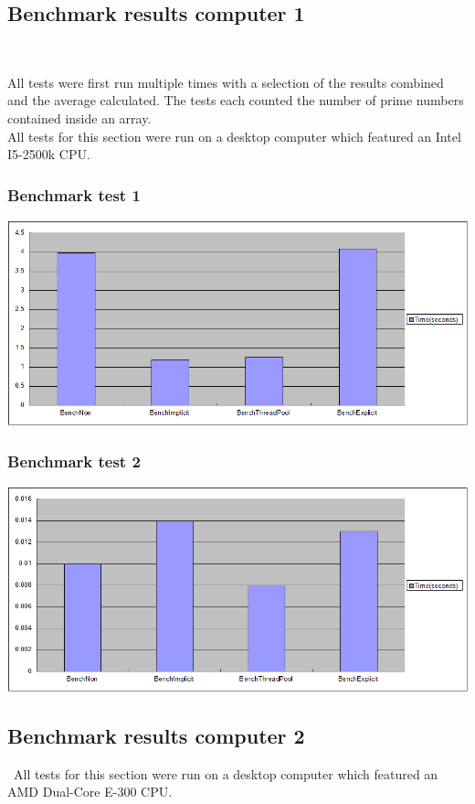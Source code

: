 \documentclass[10pt]{article}  %
\theoremstyle{definition}
\theoremstyle{remark}
\begin{document}
\newpage
\begin{appendices}

\subsection{Benchmark results computer 1}\

All tests were first run multiple times with a selection of the results combined and
the average calculated. The tests each counted the number of prime numbers contained inside an array.\\

All tests for this section were run on a desktop computer which featured an Intel I5-2500k CPU.\\

\subsubsection{Benchmark test 1}\label{ibt1}
\includegraphics[width=170mm]{benchIntel.png}
\subsubsection{Benchmark test 2}\label{ibt2}
\includegraphics[width=170mm]{benchIntel2.png}

\newpage
\subsection{Benchmark results computer 2}\
All tests for this section were run on a desktop computer which featured an AMD Dual-Core E-300 CPU.\\

\end{appendices}
\end{document}

